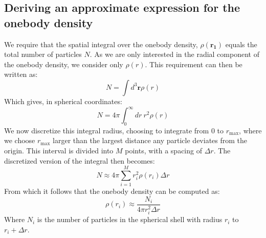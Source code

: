 \documentclass[a4paper, 10pt]{article}
\begin{document}
\begin{appendices}
		\section{Deriving an approximate expression for the onebody density}\label{ap:approximte_onebody_density}
		We require that the spatial integral over the onebody density, $\rho(\boldsymbol{r_1})$ equals the total number of particles $N$. As we are only interested in the radial component of the onebody density, we consider only $\rho(r)$. This requirement can then be written as:
		\begin{equation}
		N=\int d^3 \boldsymbol{r} \rho(r)
		\end{equation} 
		Which gives, in spherical coordinates:
		\begin{equation}
		N=4\pi \int_0^{\infty}dr\  r^2 \rho(r)
		\end{equation}
		We now discretize this integral radius, choosing to integrate from $0$ to $r_{\mathrm{max}}$, where we choose $r_{\mathrm{max}}$ larger than the largest distance any particle deviates from the origin. This interval is divided into $M$ points, with a spacing of $\Delta r$. The discretized version of the integral then becomes:
		\begin{equation}
		N\approx 4\pi \sum_{i=1}^M r_i^2 \rho(r_i) \Delta r
		\end{equation}
		From which it follows that the onebody density can be computed as:
		\begin{equation}
		\rho(r_i)\approx \frac{N_i}{4\pi r_i^2 \Delta r}
		\end{equation}
		Where $N_i$ is the number of particles in the spherical shell with radius $r_i$ to $r_i+\Delta r$.
		

\end{appendices}
\end{document}
